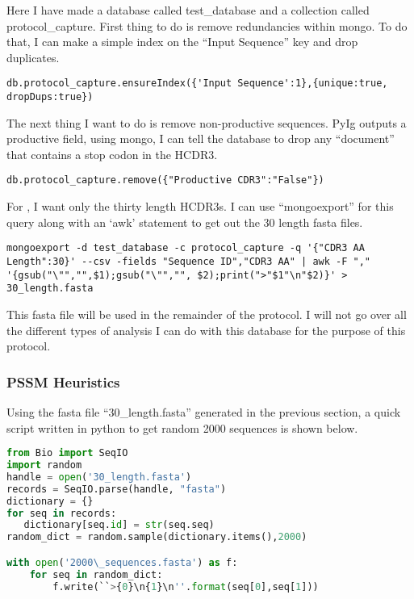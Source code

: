 Here I have made a database called test\_database and a collection called protocol\_capture. First thing to do is remove redundancies within mongo. To do that, I can make a simple index on the ``Input Sequence'' key and drop duplicates.

\begin{lstlisting}[breaklines=true]
db.protocol_capture.ensureIndex({'Input Sequence':1},{unique:true, dropDups:true})
\end{lstlisting}

The next thing I want to do is remove non-productive sequences. PyIg outputs a productive field, using mongo, I can tell the database to drop any ``document'' that contains a stop codon in the HCDR3.

\begin{lstlisting}[breaklines=true]
db.protocol_capture.remove({"Productive CDR3":"False"})
\end{lstlisting}

For \rosetta, I want only the thirty length HCDR3s. I can use ``mongoexport'' for this query along with an `awk' statement to get out the 30 length fasta files.

\begin{lstlisting}[breaklines=true]
mongoexport -d test_database -c protocol_capture -q '{"CDR3 AA Length":30}' --csv -fields "Sequence ID","CDR3 AA" | awk -F "," '{gsub("\"","",$1);gsub("\"","", $2);print(">"$1"\n"$2)}' > 30_length.fasta
\end{lstlisting}

This fasta file will be used in the remainder of the protocol. I will not go over all the different types of analysis I can do with this database for the purpose of this protocol.

\subsubsection{PSSM Heuristics}

Using the fasta file ``30\_length.fasta'' generated in the previous section, a quick script written in python to get random 2000 sequences is shown below.

\begin{lstlisting}[breaklines=true, language=python]
from Bio import SeqIO
import random
handle = open('30_length.fasta')
records = SeqIO.parse(handle, "fasta")
dictionary = {}
for seq in records:
   dictionary[seq.id] = str(seq.seq)
random_dict = random.sample(dictionary.items(),2000)

with open('2000\_sequences.fasta') as f:
    for seq in random_dict:
        f.write(``>{0}\n{1}\n''.format(seq[0],seq[1]))
\end{lstlisting}

